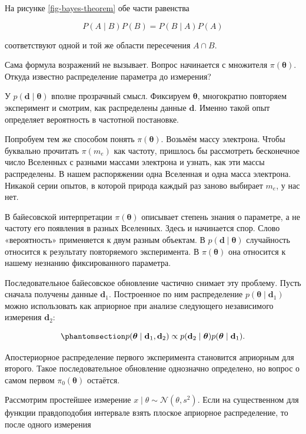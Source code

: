 \documentclass[
  russian,
  11pt,
  a4paper,
  open=any]{scrbook}
\begin{document}
На рисунке \ref{fig-bayes-theorem} обе части равенства

\[
P(A\mid B)P(B)=P(B\mid A)P(A)
\]

соответствуют одной и той же области пересечения \(A\cap B\).

Сама формула возражений не вызывает. Вопрос начинается с множителя
\(\pi(\boldsymbol{\theta})\). Откуда известно распределение параметра до
измерения?

У \(p(\mathbf d\mid\boldsymbol{\theta})\) вполне прозрачный смысл.
Фиксируем \(\boldsymbol{\theta}\), многократно повторяем эксперимент и
смотрим, как распределены данные \(\mathbf d\). Именно такой опыт
определяет вероятность в частотной постановке.

Попробуем тем же способом понять \(\pi(\boldsymbol{\theta})\). Возьмём
массу электрона. Чтобы буквально прочитать \(\pi(m_e)\) как частоту,
пришлось бы рассмотреть бесконечное число Вселенных с разными массами
электрона и узнать, как эти массы распределены. В нашем распоряжении
одна Вселенная и одна масса электрона. Никакой серии опытов, в которой
природа каждый раз заново выбирает \(m_e\), у нас нет.

В байесовской интерпретации \(\pi(\boldsymbol{\theta})\) описывает
степень знания о параметре, а не частоту его появления в разных
Вселенных. Здесь и начинается спор. Слово «вероятность» применяется к
двум разным объектам. В \(p(\mathbf d\mid\boldsymbol{\theta})\)
случайность относится к результату повторяемого эксперимента. В
\(\pi(\boldsymbol{\theta})\) она относится к нашему незнанию
фиксированного параметра.

Последовательное байесовское обновление частично снимает эту проблему.
Пусть сначала получены данные \(\mathbf d_1\). Построенное по ним
распределение \(p(\boldsymbol{\theta}\mid\mathbf d_1)\) можно
использовать как априорное при анализе следующего независимого измерения
\(\mathbf d_2\):

\begin{equation}\protect\phantomsection\label{eq-bayes-sequential-update}{
p(\boldsymbol{\theta}\mid\mathbf d_1,\mathbf d_2)
\propto
p(\mathbf d_2\mid\boldsymbol{\theta})
p(\boldsymbol{\theta}\mid\mathbf d_1).
}\end{equation}

Апостериорное распределение первого эксперимента становится априорным
для второго. Такое последовательное обновление однозначно определено, но
вопрос о самом первом \(\pi_0(\boldsymbol{\theta})\) остаётся.

Рассмотрим простейшее измерение
\(x\mid\theta\sim\mathcal N(\theta,s^2)\). Если на существенном для
функции правдоподобия интервале взять плоское априорное распределение,
то после одного измерения
\end{document}
